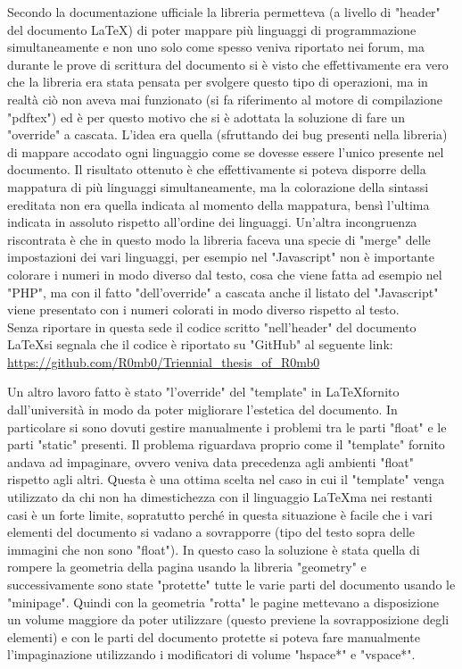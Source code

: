 Secondo la documentazione ufficiale la libreria permetteva (a livello di "header" del documento \LaTeX) di poter mappare più linguaggi di programmazione simultaneamente e non uno solo come spesso veniva riportato nei forum, ma durante le prove di scrittura del documento si è visto che effettivamente era vero che la libreria era stata pensata per svolgere questo tipo di operazioni, ma in realtà ciò non aveva mai funzionato (si fa riferimento al motore di compilazione "pdftex") ed è per questo motivo che si è adottata la soluzione di fare un "override" a cascata. L'idea era quella (sfruttando dei bug presenti nella libreria) di mappare accodato ogni linguaggio come se dovesse essere l'unico presente nel documento. Il risultato ottenuto è che effettivamente si poteva disporre della mappatura di più linguaggi simultaneamente, ma la colorazione della sintassi ereditata non era quella indicata al momento della mappatura, bensì l'ultima indicata in assoluto rispetto all'ordine dei linguaggi. Un'altra incongruenza riscontrata è che in questo modo la libreria faceva una specie di "merge" delle impostazioni dei vari linguaggi, per esempio nel "Javascript" non è importante colorare i numeri in modo diverso dal testo, cosa che viene fatta ad esempio nel "PHP", ma con il fatto "dell'override" a cascata anche il listato del "Javascript" viene presentato con i numeri colorati in modo diverso rispetto al testo.\\
Senza riportare in questa sede il codice scritto "nell'header" del documento \LaTeX si segnala che il codice è riportato su "GitHub" al seguente link: \url{https://github.com/R0mb0/Triennial_thesis_of_R0mb0}

Un altro lavoro fatto è stato "l'override" del "template" in \LaTeX fornito dall'università in modo da poter migliorare l'estetica del documento. In particolare si sono dovuti gestire manualmente i problemi tra le parti "float" e le parti "static" presenti. Il problema riguardava proprio come il "template" fornito andava ad impaginare, ovvero veniva data precedenza agli ambienti "float" rispetto agli altri. Questa è una ottima scelta nel caso in cui il "template" venga utilizzato da chi non ha dimestichezza con il linguaggio \LaTeX ma nei restanti casi è un forte limite, sopratutto perché in questa situazione è facile che i vari elementi del documento si vadano a sovrapporre  (tipo del testo sopra delle immagini che non sono "float"). In questo caso la soluzione è stata quella di rompere la geometria della pagina usando la libreria "geometry" e successivamente sono state "protette" tutte le varie parti del documento usando le "minipage". Quindi con la geometria "rotta" le pagine mettevano a disposizione un volume maggiore da poter utilizzare (questo previene la sovrapposizione degli elementi) e con le parti del documento protette si poteva fare manualmente l'impaginazione utilizzando i modificatori di volume "hspace*" e "vspace*". 